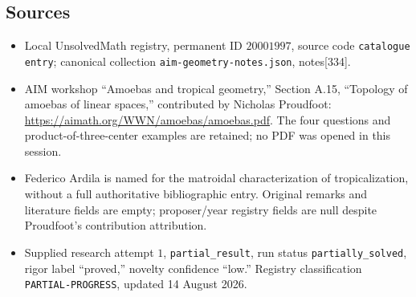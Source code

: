 \documentclass[11pt]{article}
\begin{document}
\subsection{Sources}
\begin{itemize}
\item Local UnsolvedMath registry, permanent ID \(20001997\), source code \texttt{catalogue entry}; canonical collection \texttt{aim-geometry-notes.json}, notes[334].
\item AIM workshop ``Amoebas and tropical geometry,'' Section A.15, ``Topology of amoebas of linear spaces,'' contributed by Nicholas Proudfoot: \url{https://aimath.org/WWN/amoebas/amoebas.pdf}. The four questions and product-of-three-center examples are retained; no PDF was opened in this session.
\item Federico Ardila is named for the matroidal characterization of tropicalization, without a full authoritative bibliographic entry. Original remarks and literature fields are empty; proposer/year registry fields are null despite Proudfoot's contribution attribution.
\item Supplied research attempt \(1\), \texttt{partial\_result}, run status \texttt{partially\_solved}, rigor label ``proved,'' novelty confidence ``low.'' Registry classification \texttt{PARTIAL-PROGRESS}, updated 14 August 2026.
\end{itemize}
\end{document}
